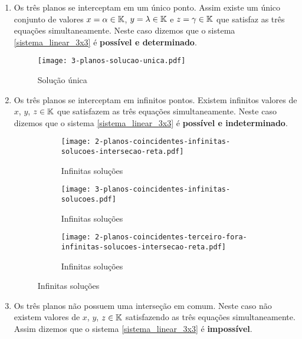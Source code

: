 \begin{enumerate}
    \item Os três planos se interceptam em um único ponto. Assim existe um único conjunto de valores $x = \alpha \in \mathbb{K}$, $y = \lambda \in \mathbb{K}$ e $z = \gamma \in \mathbb{K}$  que satisfaz as três equações simultaneamente.  Neste caso dizemos que o sistema \eqref{sistema_linear_3x3}  é \textbf{possível e determinado}.
        \begin{figure}[h]
            \centering
            \texttt{[image: 3-planos-solucao-unica.pdf]}
                \caption{Solução única}
        \end{figure}
    \item Os três planos se interceptam em infinitos pontos. Existem infinitos valores de $x$, $y$, $z \in \mathbb{K}$ que satisfazem as três equações simultaneamente. Neste caso dizemos que o sistema \eqref{sistema_linear_3x3} é \textbf{possível e indeterminado}.
        \begin{figure}[h]
            \centering
            \begin{subfigure}{.32\textwidth}
                \centering
                \texttt{[image: 2-planos-coincidentes-infinitas-solucoes-intersecao-reta.pdf]}
                \caption{Infinitas soluções}
            \end{subfigure}
            \begin{subfigure}{.32\textwidth}
                \centering
                \texttt{[image: 3-planos-coincidentes-infinitas-solucoes.pdf]}
                \caption{Infinitas soluções}
            \end{subfigure}
            \begin{subfigure}{.32\textwidth}
                \centering
                \texttt{[image: 2-planos-coincidentes-terceiro-fora-infinitas-solucoes-intersecao-reta.pdf]}
                \caption{Infinitas soluções}
            \end{subfigure}
        \end{figure}
    \item Os três planos não possuem uma interseção em comum. Neste caso não existem valores de $x$, $y$, $z \in \mathbb{K}$  satisfazendo as três equações simultaneamente. Assim dizemos que o sistema \eqref{sistema_linear_3x3}  é \textbf{impossível}.
        \begin{figure}[h]
            \centering
            \begin{subfigure}{.32\textwidth}

\end{subfigure}
\end{figure}
\end{enumerate}
